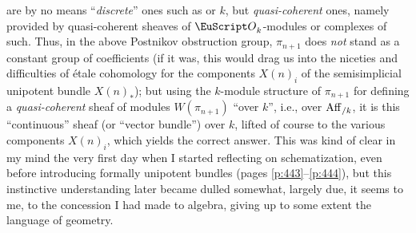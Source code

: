 are by no means ``\emph{discrete}'' ones such as \bZ{} or $k$, but
\emph{quasi-coherent} ones, namely provided by quasi-coherent sheaves
of $\scrO_k$-modules or complexes of such. Thus, in the above
Postnikov obstruction group, $\pi_{n+1}$ does \emph{not} stand as a
constant group of coefficients (if it was, this would drag us into the
niceties and difficulties of étale cohomology for the components
$X(n)_i$ of the semisimplicial unipotent bundle $X(n)_*$); but using
the $k$-module structure of $\pi_{n+1}$ for defining a
\emph{quasi-coherent} sheaf of modules $W(\pi_{n+1})$ ``over $k$'',
i.e., over $\operatorname{Aff}_{/k}$, it is this ``continuous'' sheaf (or ``vector
bundle'') over $k$, lifted of course to the various components
$X(n)_i$, which yields the correct answer. This was kind of clear in
my mind the very first day when I started reflecting on
schematization, even before introducing formally unipotent bundles
(pages \ref{p:443}--\ref{p:444}), but this instinctive understanding
later became dulled somewhat, largely due, it seems to me, to the
concession I had made to algebra, giving up to some extent the
language of geometry.

